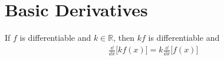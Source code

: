\section{Basic Derivatives}

\begin{theorem}
If $f$ is differentiable and $k\in\mathbb{R}$, then $kf$ is differentiable and
\begin{align*}
\frac{\dd}{\dd x}\bigl[kf(x)\bigr] =k\frac{\dd}{\dd x}\bigl[f(x)\bigr]
\end{align*}
\vspace{0 em}
\end{theorem}


